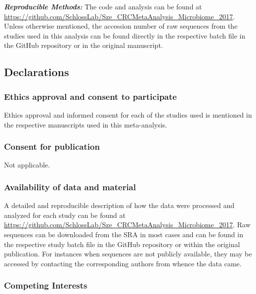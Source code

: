 \documentclass[12pt,]{article}
\begin{document}
\textbf{\emph{Reproducible Methods:}} The code and analysis can be found
at
\url{https://github.com/SchlossLab/Sze_CRCMetaAnalysis_Microbiome_2017}.
Unless otherwise mentioned, the accession number of raw sequences from
the studies used in this analysis can be found directly in the
respective batch file in the GitHub repository or in the original
manuscript.

\newpage

\subsection{Declarations}\label{declarations}

\subsubsection{Ethics approval and consent to
participate}\label{ethics-approval-and-consent-to-participate}

Ethics approval and informed consent for each of the studies used is
mentioned in the respective manuscripts used in this meta-analysis.

\subsubsection{Consent for publication}\label{consent-for-publication}

Not applicable.

\subsubsection{Availability of data and
material}\label{availability-of-data-and-material}

A detailed and reproducible description of how the data were processed
and analyzed for each study can be found at
\url{https://github.com/SchlossLab/Sze_CRCMetaAnalysis_Microbiome_2017}.
Raw sequences can be downloaded from the SRA in most cases and can be
found in the respective study batch file in the GitHub repository or
within the original publication. For instances when sequences are not
publicly available, they may be accessed by contacting the corresponding
authors from whence the data came.

\subsubsection{Competing Interests}\label{competing-interests}
\end{document}
